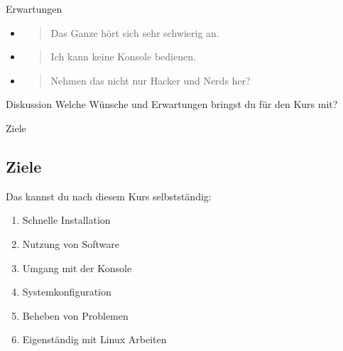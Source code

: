 \begin{frame}{Erwartungen}
    \begin{itemize}
        \item \begin{quote}\pause
            Das Ganze hört sich sehr schwierig an.
        \end{quote}\pause
        \item \begin{quote}
                  Ich kann keine Konsole bedienen.
        \end{quote}\pause
        \item \begin{quote}
                  Nehmen das nicht nur Hacker und Nerds her?
        \end{quote}
    \end{itemize}

    \pause
    \vspace{0.5cm}
    \begin{alertblock}{Diskussion}
        Welche Wünsche und Erwartungen bringst du für den Kurs mit?
    \end{alertblock}

\end{frame}

\begin{frame}{Ziele}
    \subsection{Ziele}\label{subsec:ziele}
    \pause

    Das kannst du nach diesem Kurs selbstständig:

    \pause
    \begin{enumerate}
        \item Schnelle Installation\pause
        \item Nutzung von Software\pause
        \item Umgang mit der Konsole\pause
        \item Systemkonfiguration\pause
        \item Beheben von Problemen\pause
        \item Eigenständig mit Linux Arbeiten
    \end{enumerate}

\end{frame}